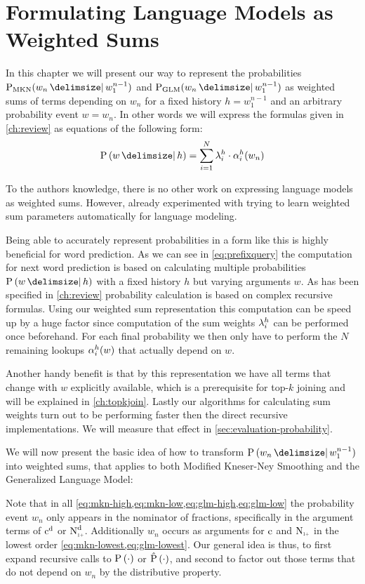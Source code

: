 \chapter{Formulating Language Models as Weighted Sums}
\label{ch:weightedsum}

In this chapter we will present our way to represent the probabilities
$\ProbMKN{w_n}{w_1^{n-1}}$ and $\ProbGLM{w_n}{w_1^{n-1}}$ as weighted sums of
terms depending on $w_n$ for a fixed history $h = w_1^{n-1}$ and an  arbitrary
probability event $w = w_n$.
In other words we will express the formulas given in \cref{ch:review} as
equations of the following form:
\begin{equation}
  \label{eq:weightedsum}
  \Prob{w}{h} = \sum_{i = 1}^{N} \SumWeight_i^h \cdot \SumArg_i^h(w_n)
\end{equation}

To the authors knowledge, there is no other work on expressing language models
as weighted sums.
However, \textcite{JelinekMercer1980} already experimented with trying to learn
weighted sum parameters automatically for language modeling.

Being able to accurately represent probabilities in a form like this is highly
beneficial for word prediction.
As we can see in \cref{eq:prefixquery} the computation for next word prediction
is based on calculating multiple probabilities $\Prob{w}{h}$ with a fixed
history $h$ but varying arguments $w$.
As has been specified in \cref{ch:review} probability calculation is based on
complex recursive formulas.
Using our weighted sum representation this computation can be speed up by
a huge factor since computation of the sum weights $\lambda^h_i$ can
be performed once beforehand.
For each final probability we then only have to perform the $N$ remaining
lookups $\alpha^h_i(w)$ that actually depend on $w$.

Another handy benefit is that by this representation we have all terms that
change with $w$ explicitly available, which is a prerequisite for top-$k$
joining and will be explained in \cref{ch:topkjoin}.
Lastly our algorithms for calculating sum weights turn out to be performing
faster
then the direct recursive implementations.
We will measure that effect in \cref{sec:evaluation-probability}.

We will now present the basic idea of how to transform $\Prob{w_n}{w_1^{n-1}}$
into weighted sums, that applies to both Modified Kneser-Ney Smoothing and
the Generalized Language Model:

Note that in all \cref{eq:mkn-high,eq:mkn-low,eq:glm-high,eq:glm-low} the
probability event $w_n$ only appears in the nominator of fractions, specifically
in the argument terms of $\DiscountedCount$ or $\DiscountedCount*$.
Additionally $w_n$ occurs as arguments for $\operatorname{c}$ and $\ContCountIp$ in the
lowest order \cref{eq:mkn-lowest,eq:glm-lowest}.
Our general idea is thus, to first expand recursive calls to
$\Prob(\DummyArg)$ or $\Prob*(\DummyArg)$, and second to factor
out those terms that do not depend on $w_n$ by the distributive property.

